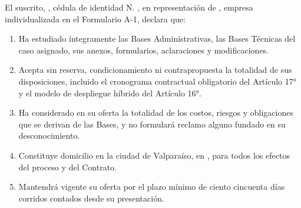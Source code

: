 \documentclass[carta,firma]{lafrox}
\begin{document}
\portadalafrox


El suscrito, \LFXrepresentante, cédula de identidad N.\textdegree{} \LFXcedularepresentante, en representación de \LFXempresa, empresa individualizada en el Formulario A-1, declara que:

\begin{enumerate}
  \item Ha estudiado íntegramente las Bases Administrativas, las Bases Técnicas del caso asignado, sus anexos, formularios, aclaraciones y modificaciones.
  \item Acepta sin reserva, condicionamiento ni contrapropuesta la totalidad de sus disposiciones, incluido el cronograma contractual obligatorio del Artículo 17° y el modelo de despliegue híbrido del Artículo 16°.
  \item Ha considerado en su oferta la totalidad de los costos, riesgos y obligaciones que se derivan de las Bases, y no formulará reclamo alguno fundado en su desconocimiento.
  \item Constituye domicilio en la ciudad de Valparaíso, en \LFXdomicilio, para todos los efectos del proceso y del Contrato.
  \item Mantendrá vigente su oferta por el plazo mínimo de ciento cincuenta días corridos contados desde su presentación.
\end{enumerate}

\bloquefirma
\constancianotarialsimulada
\end{document}
